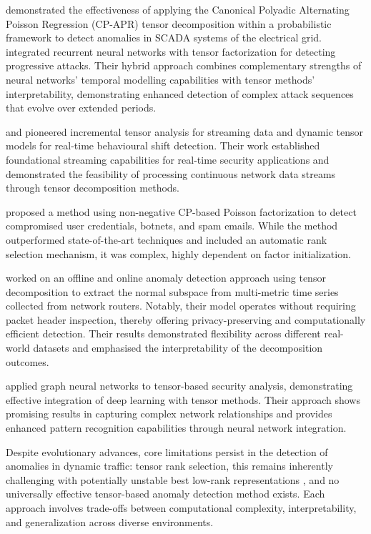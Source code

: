 \documentclass[pdflatex,sn-mathphys-num]{sn-jnl}
\theoremstyle{thmstyleone}
\theoremstyle{thmstyletwo}
\theoremstyle{thmstylethree}
\begin{document}
\cite{most2023electrical} demonstrated the effectiveness of applying the Canonical Polyadic Alternating Poisson Regression (CP-APR) tensor decomposition within a probabilistic framework to detect anomalies in SCADA systems of the electrical grid.  \cite{zhang2019hybrid} integrated recurrent neural networks with tensor factorization for detecting progressive attacks. Their hybrid approach combines complementary strengths of neural networks' temporal modelling capabilities with tensor methods' interpretability, demonstrating enhanced detection of complex attack sequences that evolve over extended periods.


\cite{sun2006incremental} and \cite{sun2006beyond} pioneered incremental tensor analysis for streaming data and dynamic tensor models for real-time behavioural shift detection. Their work established foundational streaming capabilities for real-time security applications and demonstrated the feasibility of processing continuous network data streams through tensor decomposition methods.


\cite{eren2023general} proposed a method using non-negative CP-based Poisson factorization to detect compromised user credentials, botnets, and spam emails. While the method outperformed state-of-the-art techniques and included an automatic rank selection mechanism, it was complex, highly dependent on factor initialization. 


\cite{streit2021network} worked on an offline and online anomaly detection approach using tensor decomposition to extract the normal subspace from multi-metric time series collected from network routers. Notably, their model operates without requiring packet header inspection, thereby offering privacy-preserving and computationally efficient detection. Their results demonstrated flexibility across different real-world datasets and emphasised the interpretability of the decomposition outcomes. 

\cite{wu2021graph} applied graph neural networks to tensor-based security analysis, demonstrating effective integration of deep learning with tensor methods. Their approach shows promising results in capturing complex network relationships and provides enhanced pattern recognition capabilities through neural network integration. 


Despite evolutionary advances, core limitations persist in the detection of anomalies in dynamic traffic: tensor rank selection, this remains inherently challenging with potentially unstable best low-rank representations \cite{kruskal1977three, kolda2009tensor}, and no universally effective tensor-based anomaly detection method exists. Each approach involves trade-offs between computational complexity, interpretability, and generalization across diverse environments. 
\end{document}
